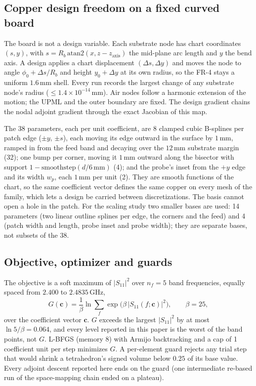 \documentclass{anvil-paper}
\begin{document}
\subsection{Copper design freedom on a fixed curved board}
\label{sec:freedom}

The board is not a design variable. Each substrate node has chart
coordinates $(s, y)$, with $s = R_b\,\mathrm{atan2}(x, z - z_{\mathrm{axis}})$
the mid-plane arc length and $y$ the bend axis. A design applies a chart
displacement $(\Delta s, \Delta y)$ and moves the node to angle
$\phi_0 + \Delta s/R_b$ and height $y_0 + \Delta y$ at its own radius, so
the FR-4 stays a uniform $1.6$\,mm shell. Every run records the largest
change of any substrate node's radius ($\le 1.4\times10^{-14}$\,mm). Air
nodes follow a harmonic extension of the motion; the UPML and the outer
boundary are fixed. The design gradient chains the nodal adjoint gradient
through the exact Jacobian of this map.

The 38 parameters, each per unit coefficient, are $8$ clamped cubic
B-splines per patch edge ($\pm y$, $\pm s$), each moving its edge outward in
the surface by $1$\,mm, ramped in from the feed band and decaying over the
$12$\,mm substrate margin (32); one bump per corner, moving it $1$\,mm
outward along the bisector with support $1 - \mathrm{smoothstep}(d/6\,\mathrm{mm})$
(4); and the probe's inset from the $+y$ edge and its width $w_p$, each
$1$\,mm per unit (2). They
are smooth functions of the chart, so the same coefficient vector defines
the same copper on every mesh of the family, which lets a design be carried
between discretizations. The basis cannot open a hole in the patch. For the
scaling study two smaller bases are used: 14 parameters (two linear outline
splines per edge, the corners and the feed) and 4 (patch width and length,
probe inset and probe width); they are separate bases, not subsets of the
38.

\subsection{Objective, optimizer and guards}
\label{sec:objective}

The objective is a soft maximum of $|S_{11}|^2$ over $n_f = 5$ band
frequencies, equally spaced from $2.400$ to $2.4835$\,GHz,
\begin{equation}
  G(\mathbf{c}) = \frac{1}{\beta}\ln \sum_{f} \exp\!\big(\beta\,|S_{11}(f;\mathbf{c})|^2\big),
  \qquad \beta = 25,
  \label{eq:objective}
\end{equation}
over the coefficient vector $\mathbf{c}$. $G$ exceeds the largest
$|S_{11}|^2$ by at most $\ln 5/\beta = 0.064$, and every level reported in
this paper is the worst of the band points, not $G$. L-BFGS (memory 8) with
Armijo backtracking and a cap of 1 coefficient unit per step minimizes $G$.
A per-element guard rejects any trial step that would shrink a
tetrahedron's signed volume below $0.25$ of its base value. Every adjoint
descent reported here ends on the guard (one intermediate re-based run of
the space-mapping chain ended on a plateau).
\end{document}
